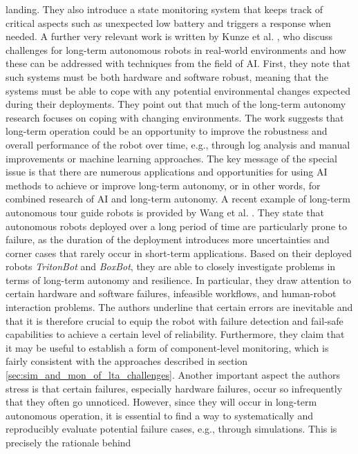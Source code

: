 \documentclass[english, master, utf8]{base/thesis_KBS}
\begin{document}
landing. They also introduce a state monitoring system that keeps track of critical aspects such as unexpected low battery and triggers a response when needed.\newline
A further very relevant work is written by Kunze et al. \cite{KunzeSI:2018}, who discuss challenges for long-term autonomous robots in real-world environments and how these can be addressed with techniques from the field of AI.
First, they note that such systems must be both hardware and software robust, meaning that the systems must be able to cope with any potential environmental changes expected
during their deployments. \cite{KunzeSI:2018} They point out that much of the long-term autonomy research focuses on coping with changing environments. The work suggests that
long-term operation could be an opportunity to improve the robustness and overall performance of the robot over time, e.g., through log analysis and manual improvements or machine
learning approaches. The key message of the special issue is that there are numerous applications and opportunities for using AI methods to achieve or improve long-term autonomy,
or in other words, for combined research of AI and long-term autonomy.\newline
A recent example of long-term autonomous tour guide robots is provided by Wang et al. \cite{Wang:2018}. They state that autonomous robots deployed over a long period of time are
particularly prone to failure, as the duration of the deployment introduces more uncertainties and corner cases that rarely occur in short-term applications. Based on their deployed
robots \textit{TritonBot} and \textit{BoxBot}, they are able to closely investigate problems in terms of long-term autonomy and resilience. In particular, they draw attention to
certain hardware and software failures, infeasible workflows, and human-robot interaction problems. The authors underline that certain errors are inevitable and that it is therefore
crucial to equip the robot with failure detection and fail-safe capabilities to achieve a certain level of reliability. Furthermore, they claim that it may be useful to establish a form
of component-level monitoring, which is fairly consistent with the approaches described in section \ref{sec:sim_and_mon_of_lta_challenges}. Another important aspect the authors
stress is that certain failures, especially hardware failures, occur so infrequently that they often go unnoticed. However, since they will occur in long-term autonomous operation,
it is essential to find a way to systematically and reproducibly evaluate potential failure cases, e.g., through simulations. \cite{Wang:2018} This is precisely the rationale behind
\end{document}
